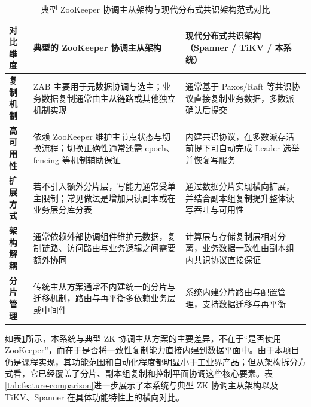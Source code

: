 \documentclass[UTF8,a4paper,12pt]{ctexart}
\begin{document}
\begin{table}[!htbp]
  \centering
  \caption{典型 ZooKeeper 协调主从架构与现代分布式共识架构范式对比}
  \label{tab:arch-comparison}
  \begin{tcolorbox}[
    enhanced,
    colback=white,
    colframe=GoogleBorder,
    arc=6pt,
    boxrule=1pt,
    left=0pt, right=0pt, top=0pt, bottom=0pt,
    boxsep=0pt,
    fontupper=\sffamily
  ]
  \renewcommand{\arraystretch}{1.8}
  \begin{tabularx}{\textwidth}{p{2.5cm} | X | X}
    \rowcolor{GoogleHeader}
    \textbf{对比维度} & \textbf{典型的 ZooKeeper 协调主从架构} & \textbf{现代分布式共识架构（Spanner / TiKV / 本系统）} \\
    \hline
    \textbf{复制机制} & ZAB 主要用于元数据协调与选主；业务数据复制通常由主从链路或其他独立机制实现 & 通常基于 Paxos/Raft 等共识协议直接复制业务数据，多数派确认后提交 \\
    \hline
    \textbf{高可用性} & 依赖 ZooKeeper 维护主节点状态与切换流程；切换正确性通常还需 epoch、fencing 等机制辅助保证 & 内建共识协议，在多数派存活前提下可自动完成 Leader 选举并恢复写服务 \\
    \hline
    \textbf{扩展方式} & 若不引入额外分片层，写能力通常受单主限制；常见做法是增加只读副本或在业务层分库分表 & 通过数据分片实现横向扩展，并结合副本组复制提升整体读写吞吐与可用性 \\
    \hline
    \textbf{架构解耦} & 通常依赖外部协调组件维护元数据，复制链路、访问路由与业务逻辑之间需要额外协同 & 计算层与存储复制层相对分离，业务数据一致性由副本组内共识协议直接保证 \\
    \hline
    \textbf{分片管理} & 传统主从方案通常不内建统一的分片与迁移机制，路由与再平衡多依赖业务层或中间件 & 系统内建分片路由与配置管理，支持数据迁移与再平衡 \\
  \end{tabularx}
  \end{tcolorbox}
\end{table}

如表\ref{tab:arch-comparison}所示，本系统与典型 ZK 协调主从方案的主要差异，不在于“是否使用 ZooKeeper”，而在于是否将一致性复制能力直接内建到数据平面中。由于本项目仍是课程实现，其功能范围和自动化程度都明显小于工业界产品；但从架构拆分方式看，它已经覆盖了分片、副本组复制和控制平面协调这些核心要素。表\ref{tab:feature-comparison}进一步展示了本系统与典型 ZK 协调主从架构以及 TiKV、Spanner 在具体功能特性上的横向对比。
\end{document}
